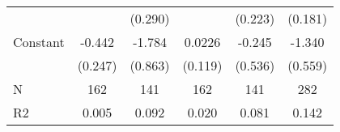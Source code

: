 {\begin{tabular}{l*{5}{c}}
                    &                     &     (0.290)         &                     &     (0.223)         &     (0.181)         \\
[1em]
Constant            &      -0.442\sym{*}  &      -1.784\sym{**} &      0.0226         &      -0.245         &      -1.340\sym{**} \\
                    &     (0.247)         &     (0.863)         &     (0.119)         &     (0.536)         &     (0.559)         \\
\hline
N                   &         162         &         141         &         162         &         141         &         282         \\
R2                  &       0.005         &       0.092         &       0.020         &       0.081         &       0.142         \\
\hline\hline
\end{tabular}
}
